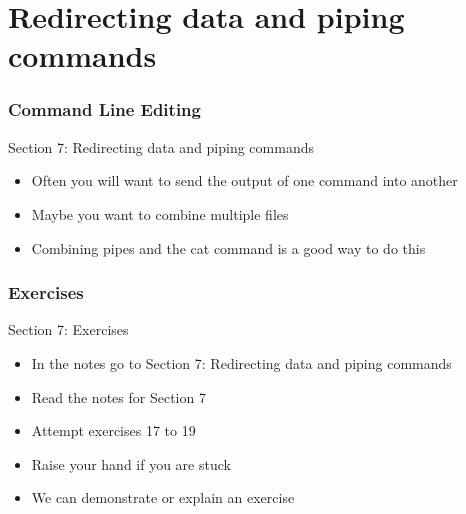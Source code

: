 \part{Redirecting data and piping commands}
\begin{frame}
\partpage
\end{frame}

\section{Command Line Editing}
\begin{frame}{Section 7: Redirecting data and piping commands}
\begin{itemize}
\item Often you will want to send the output of one command into another
\item Maybe you want to combine multiple files
\item Combining pipes and the cat command is a good way to do this
\end{itemize}
\end{frame}


\section{Exercises}
\begin{frame}{Section 7: Exercises}
\begin{itemize}
\item In the notes go to {Section 7: Redirecting data and piping commands}
\item Read the notes for Section 7 
\item Attempt exercises 17 to 19
\item Raise your hand if you are stuck
\item We can demonstrate or explain an exercise
\end{itemize}
\end{frame}

